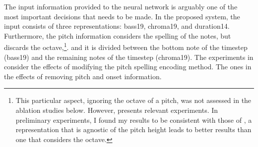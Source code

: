 
The input information provided to the neural network is
arguably one of the most important decisions that needs to
be made. In the proposed system, the input consists of three
representations: \gls{bass19}, \gls{chroma19}, and
\gls{duration14}. Furthermore, the pitch information
considers the spelling of the notes, but discards the
octave,\footnote{This particular aspect, ignoring the octave
of a pitch, was not assessed in the ablation studies below.
However, \textcite{micchi2020not} presents relevant
experiments. In preliminary experiments, I found my results
to be consistent with those of \textcite{micchi2020not}, a
representation that is agnostic of the pitch height leads to
better results than one that considers the octave.}. and it
is divided between the bottom note of the timestep
(\gls{bass19}) and the remaining notes of the timestep
(\gls{chroma19}). The experiments in
 consider the
effects of modifying the pitch spelling encoding method. The
ones in  the effects of
removing pitch and onset information.
